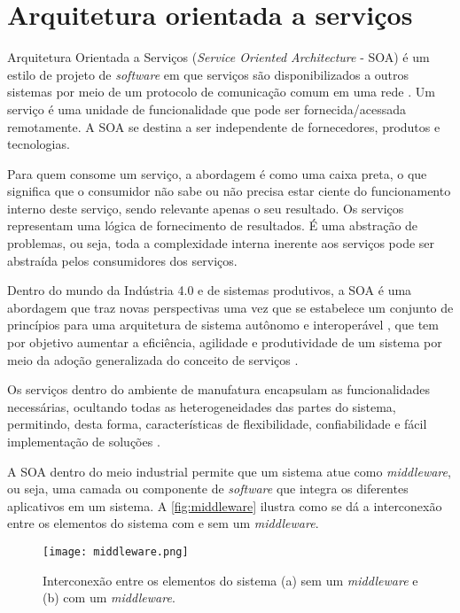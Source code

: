 \section{Arquitetura orientada a serviços}
\label{sec:webservices}
	
	Arquitetura Orientada a Serviços (\textit{Service Oriented Architecture} - SOA) é um estilo de projeto de \textit{software} em que serviços são disponibilizados a outros sistemas por meio de um protocolo de comunicação comum em uma rede \cite{bell2008soa}. Um serviço é uma unidade de funcionalidade que pode ser fornecida/acessada remotamente. A SOA se destina a ser independente de fornecedores, produtos e tecnologias.
	
	Para quem consome um serviço, a abordagem é como uma caixa preta, o que significa que o consumidor não sabe ou não precisa estar ciente do funcionamento interno deste serviço, sendo relevante apenas o seu resultado. Os serviços representam uma lógica de fornecimento de resultados. É uma abstração de problemas, ou seja, toda a complexidade interna inerente aos serviços pode ser abstraída pelos consumidores dos serviços.
	
	Dentro do mundo da Indústria 4.0 e de sistemas produtivos, a SOA é uma abordagem que traz novas perspectivas uma vez que se estabelece um conjunto de princípios para uma arquitetura de sistema autônomo e interoperável \cite{candido2009soa}, que tem por objetivo aumentar a eficiência, agilidade e produtividade de um sistema por meio da adoção generalizada do conceito de serviços \cite{souit2013soa}.
	
	Os serviços dentro do ambiente de manufatura encapsulam as funcionalidades necessárias, ocultando todas as heterogeneidades das partes do sistema, permitindo, desta forma, características de flexibilidade, confiabilidade e fácil implementação de	soluções \cite{groba2008soa}.
	
	A SOA dentro do meio industrial permite que um sistema atue como \textit{middleware}, ou seja, uma camada ou componente de \textit{software} que integra os diferentes aplicativos em um sistema. A \autoref{fig:middleware} ilustra como se dá a interconexão entre os elementos do sistema com e sem um \textit{middleware}.
	
	\begin{figure}[htb]
		\centering
		\label{fig:middleware}
		\texttt{[image: middleware.png]}
		\caption{Interconexão entre os elementos do sistema (a) sem um \textit{middleware} e (b) com um \textit{middleware}.}
	\end{figure}

